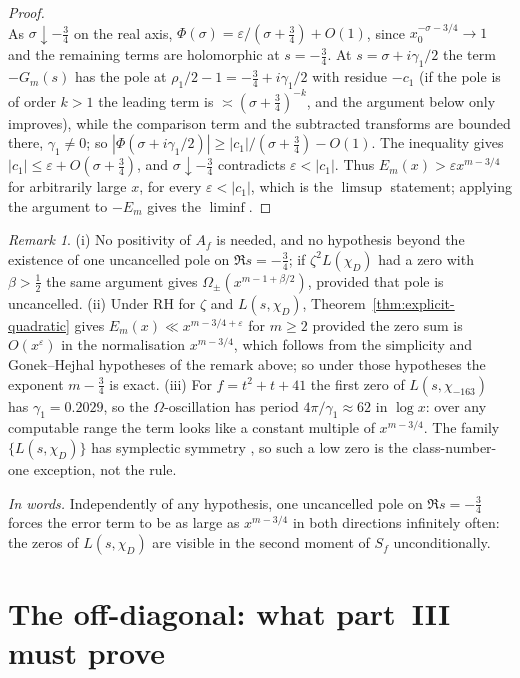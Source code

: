 \documentclass[11pt,a4paper]{article}
\theoremstyle{remark}\newtheorem{remark}[theorem]{Remark}
\begin{document}
\begin{proof}
\[\]
As $\sigma\downarrow-\tfrac34$ on the real axis, $\Phi(\sigma)=\varepsilon/(\sigma+\tfrac34)+O(1)$, since $x_0^{-\sigma-3/4}\to1$ and the
remaining terms are holomorphic at $s=-\tfrac34$. At $s=\sigma+i\gamma_1/2$ the term $-G_m(s)$ has the pole at
$\rho_1/2-1=-\tfrac34+i\gamma_1/2$ with residue $-c_1$ (if the pole is of order $k>1$ the leading term is
$\asymp(\sigma+\tfrac34)^{-k}$, and the argument below only improves), while the comparison term and the subtracted
transforms are bounded there, $\gamma_1\ne0$; so $|\Phi(\sigma+i\gamma_1/2)|\ge|c_1|/(\sigma+\tfrac34)-O(1)$. The inequality
gives $|c_1|\le\varepsilon+O(\sigma+\tfrac34)$, and $\sigma\downarrow-\tfrac34$ contradicts $\varepsilon<|c_1|$. Thus
$E_m(x)>\varepsilon x^{m-3/4}$ for arbitrarily large $x$, for every $\varepsilon<|c_1|$, which is the $\limsup$ statement;
applying the argument to $-E_m$ gives the $\liminf$.
\end{proof}

\begin{remark}
(i) No positivity of $A_f$ is needed, and no hypothesis beyond the existence of one uncancelled pole on
$\Re s=-\tfrac34$; if $\zeta^2L(\chi_D)$ had a zero with $\beta>\tfrac12$ the same argument gives
$\Omega_\pm(x^{m-1+\beta/2})$, provided that pole is uncancelled. (ii) Under RH for $\zeta$ and
$L(s,\chi_D)$, Theorem~\ref{thm:explicit-quadratic} gives $E_m(x)\ll x^{m-3/4+\varepsilon}$ for $m\ge2$
provided the zero sum is $O(x^{\varepsilon})$ in the normalisation $x^{m-3/4}$, which follows from the
simplicity and Gonek--Hejhal hypotheses of the remark above; so under those hypotheses the exponent
$m-\tfrac34$ is exact. (iii) For $f=t^2+t+41$ the first zero of $L(s,\chi_{-163})$ has $\gamma_1=0.2029$, so the
$\Omega$-oscillation has period $4\pi/\gamma_1\approx62$ in $\log x$: over any computable range the term
looks like a constant multiple of $x^{m-3/4}$. The family $\{L(s,\chi_D)\}$ has symplectic symmetry
\cite{KatzSarnak1999}, so such a low zero is the class-number-one exception, not the rule.
\end{remark}

\emph{In words.} Independently of any hypothesis, one uncancelled pole on $\Re s=-\tfrac34$ forces the error
term to be as large as $x^{m-3/4}$ in both directions infinitely often: the zeros of $L(s,\chi_D)$ are
visible in the second moment of $S_f$ unconditionally.

\section{The off-diagonal: what part~III must prove}\label{sec:off}
\end{document}
